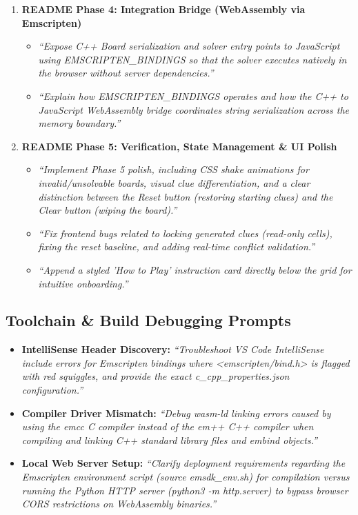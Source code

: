 \documentclass[12pt,a4paper,oneside]{book}
\begin{document}
\begin{enumerate}
    \item \textbf{README Phase 4: Integration Bridge (WebAssembly via Emscripten)}
    \begin{itemize}
        \item \textit{``Expose C++ Board serialization and solver entry points to JavaScript using EMSCRIPTEN\_BINDINGS so that the solver executes natively in the browser without server dependencies.''}
        \item \textit{``Explain how EMSCRIPTEN\_BINDINGS operates and how the C++ to JavaScript WebAssembly bridge coordinates string serialization across the memory boundary.''}
    \end{itemize}

    \item \textbf{README Phase 5: Verification, State Management \& UI Polish}
    \begin{itemize}
        \item \textit{``Implement Phase 5 polish, including CSS shake animations for invalid/unsolvable boards, visual clue differentiation, and a clear distinction between the Reset button (restoring starting clues) and the Clear button (wiping the board).''}
        \item \textit{``Fix frontend bugs related to locking generated clues (read-only cells), fixing the reset baseline, and adding real-time conflict validation.''}
        \item \textit{``Append a styled 'How to Play' instruction card directly below the grid for intuitive onboarding.''}
    \end{itemize}
\end{enumerate}

\subsection{Toolchain \& Build Debugging Prompts}
\begin{itemize}
    \item \textbf{IntelliSense Header Discovery:} \textit{``Troubleshoot VS Code IntelliSense include errors for Emscripten bindings where <emscripten/bind.h> is flagged with red squiggles, and provide the exact c\_cpp\_properties.json configuration.''}
    \item \textbf{Compiler Driver Mismatch:} \textit{``Debug wasm-ld linking errors caused by using the emcc C compiler instead of the em++ C++ compiler when compiling and linking C++ standard library files and embind objects.''}
    \item \textbf{Local Web Server Setup:} \textit{``Clarify deployment requirements regarding the Emscripten environment script (source emsdk\_env.sh) for compilation versus running the Python HTTP server (python3 -m http.server) to bypass browser CORS restrictions on WebAssembly binaries.''}
\end{itemize}
\end{document}
